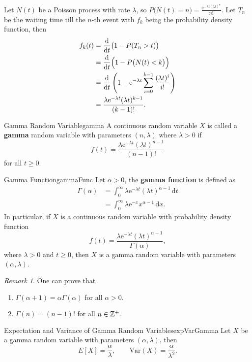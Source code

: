 \documentclass[math]{amznotes}
\theoremstyle{remark}
\newtheorem*{remark}{Remark}
\newcommand{\e}{\mathrm{e}}
\newcommand{\dif}{\mathrm{d}}
\begin{document}
Let $N(t)$ be a Poisson process with rate $\lambda$, so $P\bigl(N(t) = n\bigr) = \frac{\e^{-\lambda t\left(\lambda t\right)^n}}{n!}$. Let $T_n$ be the waiting time till the $n$-th event with $f_k$ being the probability density function, then
\begin{align*}
    f_k(t) & = \frac{\dif}{\dif t}\bigl(1 - P(T_n > t)\bigr) \\
    & = \frac{\dif}{\dif t}\Bigl(1 - P\bigl(N(t) < k\bigr)\Bigr) \\
    & = \frac{\dif}{\dif t}\left(1 - \e^{-\lambda t}\sum_{i = 0}^{k - 1}\frac{(\lambda t)^i}{i!}\right) \\
    & = \frac{\lambda\e^{-\lambda t}(\lambda t)^{k - 1}}{(k - 1)!}.
\end{align*}
\begin{dfnbox}{Gamma Random Variable}{gamma}
    A continuous random variable $X$ is called a {\color{red} \textbf{gamma}} random variable with parameters $(n, \lambda)$ where $\lambda > 0$ if 
    \begin{equation*}
        f(t) = \frac{\lambda\e^{-\lambda t}(\lambda t)^{n - 1}}{(n - 1)!}
    \end{equation*}
    for all $t \geq 0$.
\end{dfnbox}
\begin{dfnbox}{Gamma Function}{gammaFunc}
    Let $\alpha > 0$, the {\color{red} \textbf{gamma function}} is defined as
    \begin{align*}
        \Gamma(\alpha) & = \int_{0}^{\infty}\!\lambda\e^{-\lambda t}(\lambda t)^{\alpha - 1}\,\dif t \\
        & = \int_{0}^{\infty}\!\lambda\e^{-x}x^{\alpha - 1}\,\dif x.
    \end{align*}
    In particular, if $X$ is a continuous random variable with probability density function
    \begin{equation*}
        f(t) = \frac{\lambda\e^{-\lambda t}(\lambda t)^{\alpha - 1}}{\Gamma(\alpha)},
    \end{equation*}
    where $\lambda > 0$ and $t \geq 0$, then $X$ is a gamma random variable with parameters $(\alpha, \lambda)$.
\end{dfnbox}
\begin{notebox}
    \begin{remark}
        One can prove that
        \begin{enumerate}
            \item $\Gamma(\alpha + 1) = \alpha\Gamma(\alpha)$ for all $\alpha > 0$.
            \item $\Gamma(n) = (n - 1)!$ for all $n \in \mathbb{Z}^+$.
        \end{enumerate}
    \end{remark}
\end{notebox}
\begin{thmbox}{Expectation and Variance of Gamma Random Variables}{expVarGamma}
    Let $X$ be a gamma random variable with parameters $(\alpha, \lambda)$, then 
    \begin{equation*}
        E[X] = \frac{\alpha}{\lambda}, \qquad \mathrm{Var}(X) = \frac{\alpha}{\lambda^2}.
    \end{equation*}
\end{thmbox}
\end{document}
